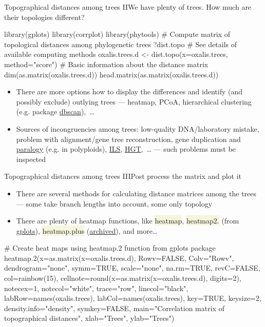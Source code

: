 \documentclass[compress, ucs, xelatex, 11pt, xcolor=svgnames, aspectratio=169,
	hyperref={
		bookmarks=true,
		unicode=true,
		colorlinks=true,
		pdftitle={Molecular data in R},
		plainpages=false,
		pdfauthor={Vojtech Zeisek},
		pdfsubject={Course about phylogeny and evolution in R},
		pdfcreator={XeLaTeX},
		pdfkeywords={R, evolution, phylogeny, molecular data},
		linkcolor=Crimson, %
		anchorcolor=Magenta, %
		citecolor=Magenta, %
		filecolor=Magenta, %
		menucolor=Magenta, %
		urlcolor=DodgerBlue, %
		pdftex},
	url={hyphens, lowtilde} %
	]{beamer}
\renewcommand{\texttt}[1]{\colorbox{Beige}{{\ttfamily #1}}}
\begin{document}
\begin{frame}[fragile]{Topographical distances among trees II}{We have plenty of trees. How much are their topologies different?}
	\begin{spluscode}
    library(gplots)
    library(corrplot)
    library(phytools)
    # Compute matrix of topological distances among phylogenetic trees
    ?dist.topo # See details of available computing methods
    oxalis.trees.d <- dist.topo(x=oxalis.trees, method="score")
    # Basic information about the distance matrix
    dim(as.matrix(oxalis.trees.d))
    head.matrix(as.matrix(oxalis.trees.d))
	\end{spluscode}
	\begin{itemize}
		\item There are more options how to display the differences and identify (and possibly exclude) outlying trees --- heatmap, PCoA, hierarchical clustering (e.g. package \href{https://CRAN.R-project.org/package=dbscan}{dbscan}),~\ldots
		\item Sources of incongruencies among trees: low-quality DNA/laboratory mistake, problem with alignment/gene tree reconstruction, gene duplication and \href{https://en.wikipedia.org/wiki/Sequence_homology}{paralogy} (e.g. in polyploids), \href{https://en.wikipedia.org/wiki/Incomplete_lineage_sorting}{ILS}, \href{https://en.wikipedia.org/wiki/Horizontal_gene_transfer}{HGT},~\ldots{ } --- such problems must be inspected
	\end{itemize}
\end{frame}

\begin{frame}[fragile]{Topographical distances among trees III}{Post process the matrix and plot it}
	\begin{itemize}
		\item There are several methods for calculating distance matrices among the trees --- some take branch lengths into account, some only topology
		\item There are plenty of heatmap functions, like \texttt{heatmap}, \texttt{heatmap2.} (from \href{https://cran.r-project.org/package=gplots}{gplots}), \texttt{heatmap.plus} (\href{https://cran.r-project.org/package=heatmap.plus}{archived}), and more\ldots
	\end{itemize}
	\begin{spluscode}
    # Create heat maps using heatmap.2 function from gplots package
    heatmap.2(x=as.matrix(x=oxalis.trees.d), Rowv=FALSE, Colv="Rowv",
      dendrogram="none", symm=TRUE, scale="none", na.rm=TRUE, revC=FALSE,
      col=rainbow(15), cellnote=round(x=as.matrix(x=oxalis.trees.d), digits=2),
      notecex=1, notecol="white", trace="row", linecol="black",
      labRow=names(oxalis.trees), labCol=names(oxalis.trees), key=TRUE,
      keysize=2, density.info="density", symkey=FALSE, main="Correlation
      matrix of topographical distances", xlab="Trees", ylab="Trees")
	\end{spluscode}
\end{frame}
\end{document}
